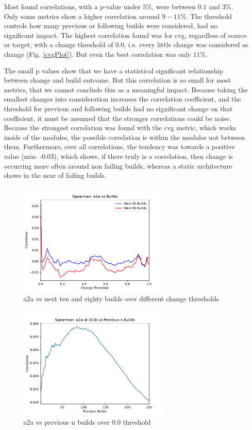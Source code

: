 \documentclass[sigplan, anonymous, review]{acmart}
\begin{document}
Most found correlations, with a p-value under $5\%$, were between $0.1$ and $3\%$. Only some metrics show a higher correlation around $9-11\%$. The threshold controls how many previous or following builds were considered, had no significant impact. The highest correlation found was for cvg, regardless of source or target, with a change threshold of $0.0$, i.e. every little change was considered as change (Fig. \ref{cvgPlot}). But even the best correlation was only $11\%$. 

The small p values show that we have a statistical significant relationship between change and build outcome. But this correlation is so small for most metrics, that we cannot conclude this as a meaningful impact. Because taking the smallest changes into consideration increases the correlation coefficient, and the threshold for previous and following builds had no significant change on that coefficient, it must be assumed that the stronger correlations could be noise. Because the strongest correlation was found with the cvg metric, which works inside of the modules, the possible correlation is within the modules not between them. Furthermore, over all correlations, the tendency was towards a positive value (min: -0.03), which shows, if there truly is a correlation, then change is occurring more often around non failing builds, whereas a static architecture shows in the near of failing builds. 

\begin{figure}[!t]
	\centering
	\includegraphics[width=3in]{assets/a2aCorr}
	\caption{a2a vs next ten and eighty builds over different change thresholds }
	\label{a2aPlot}
\end{figure}

\begin{figure}[!t]
	\centering
	\includegraphics[width=3in]{assets/PrevN}
	\caption{a2a vs previous n builds over 0.0 threshold }
	\label{a2aPrevN}
\end{figure}
\end{document}
